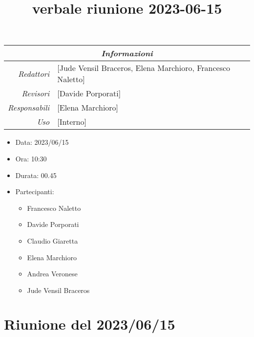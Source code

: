 \documentclass[12pt]{article}
\begin{document}
\graphicspath{ {../../templates/img} }

\title{verbale riunione 2023-06-15}

\firstPage
\maketitle

\begin{center}
\begin{tabular}{r | l}
    \multicolumn{2}{c}{\textit{Informazioni}}\\
    \hline
    
        \textit{Redattori} &
        [Jude Vensil Braceros, Elena Marchioro, Francesco Naletto]\makecell{}\\
    
        \textit{Revisori} &
        [Davide Porporati]\makecell{}\\
        \textit{Responsabili} &
        [Elena Marchioro]\makecell{}\\
            \textit{Uso} & 
            [Interno]\makecell{}\\
\end{tabular}
    \begin{itemize}
    \item[] Data: 2023/06/15
    \item[] Ora: 10:30
    \item[] Durata: 00.45
    \item[] Partecipanti:
    \begin{itemize}
    \item[] Francesco Naletto
    \item[] Davide Porporati
    \item[] Claudio Giaretta
    \item[] Elena Marchioro
    \item[] Andrea Veronese
    \item[] Jude Vensil Braceros
    \end{itemize}
\end{itemize}
\end{center}


\tableofcontents
\printindex 
\section{Riunione del 2023/06/15}
\end{document}
